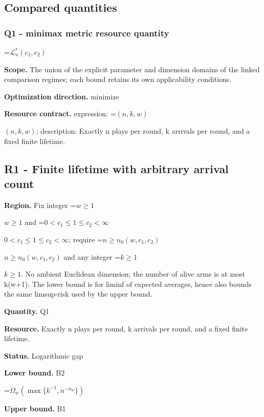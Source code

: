 \documentclass[10pt,a4paper]{article}
\newcommand{\AtlasMath}[1]{\par\begingroup\centering\setbox0=\hbox{$\displaystyle #1$}\ifdim\wd0>1.4\linewidth\typeout{ATLAS WIDE FORMULA: \the\wd0}\fi\ifdim\wd0>\linewidth\resizebox{\linewidth}{!}{\box0}\else\box0\fi\par\endgroup}
\newcommand{\AtlasInlineMath}[1]{\begingroup\setbox0=\hbox{$#1$}\ifdim\wd0>.4\linewidth\endgroup\AtlasMath{#1}\else\endgroup$#1$\fi}
\begin{document}
\subsection{Compared quantities}


\subsubsection{Q1 - minimax metric resource quantity}


\AtlasMath{\mathcal L_n^*(c_1,c_2)}


\textbf{Scope.} The union of the explicit parameter and dimension domains of the linked comparison regimes; each bound retains its own applicability conditions.



\textbf{Optimization direction.} minimize



\textbf{Resource contract.} expression: \AtlasInlineMath{(n,k,w)}; description: Exactly n plays per round, k arrivals per round, and a fixed finite lifetime.



\subsection{R1 - Finite lifetime with arbitrary arrival count}


\textbf{Region.} Fix integer \AtlasInlineMath{w\ge1} and \AtlasInlineMath{0<c_1\le1\le c_2<\infty}; require \AtlasInlineMath{n\ge n_0(w,c_1,c_2)} and any integer \AtlasInlineMath{k\ge1}. No ambient Euclidean dimension; the number of alive arms is at most k(w+1). The lower bound is for liminf of expected averages, hence also bounds the same limsup-risk used by the upper bound.



\textbf{Quantity.} Q1



\textbf{Resource.} Exactly n plays per round, k arrivals per round, and a fixed finite lifetime.



\textbf{Status.} Logarithmic gap



\textbf{Lower bound.} B2



\AtlasMath{\Omega_w(\max\{k^{-1},n^{-\alpha_w}\})}


\textbf{Upper bound.} B1
\end{document}
